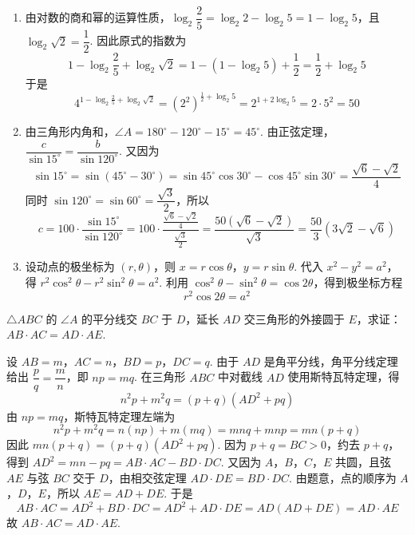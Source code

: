 \begin{solution}
\begin{enumerate}
\item 由对数的商和幂的运算性质，\(\log_2\dfrac25=\log_2 2-\log_2 5=1-\log_2 5\)，且 \(\log_2\sqrt2=\dfrac12\). 因此原式的指数为
\[
1-\log_2\dfrac25+\log_2\sqrt2
=1-\left(1-\log_2 5\right)+\dfrac12
=\dfrac12+\log_2 5
\]
于是
\[
4^{1-\log_2\frac25+\log_2\sqrt2}=\left(2^2\right)^{\frac12+\log_2 5}=2^{1+2\log_2 5}=2\cdot5^2=50
\]

\item 由三角形内角和，\(\angle A=180^\circ-120^\circ-15^\circ=45^\circ\). 由正弦定理，\(\dfrac{c}{\sin15^\circ}=\dfrac{b}{\sin120^\circ}\). 又因为
\[
\sin15^\circ=\sin\left(45^\circ-30^\circ\right)=\sin45^\circ\cos30^\circ-\cos45^\circ\sin30^\circ=\dfrac{\sqrt6-\sqrt2}{4}
\]
同时 \(\sin120^\circ=\sin60^\circ=\dfrac{\sqrt3}{2}\)，所以
\[
c=100\cdot\dfrac{\sin15^\circ}{\sin120^\circ}=100\cdot\dfrac{\frac{\sqrt6-\sqrt2}{4}}{\frac{\sqrt3}{2}}=\dfrac{50\left(\sqrt6-\sqrt2\right)}{\sqrt3}=\dfrac{50}{3}\left(3\sqrt2-\sqrt6\right)
\]

\item 设动点的极坐标为 \(\left(r,\theta\right)\)，则 \(x=r\cos\theta\)，\(y=r\sin\theta\). 代入 \(x^2-y^2=a^2\)，得 \(r^2\cos^2\theta-r^2\sin^2\theta=a^2\). 利用 \(\cos^2\theta-\sin^2\theta=\cos2\theta\)，得到极坐标方程
\[
r^2\cos2\theta=a^2
\]
\end{enumerate}
\end{solution}

\begin{problem}
\(\triangle ABC\) 的 \(\angle A\) 的平分线交 \(BC\) 于 \(D\)，延长 \(AD\) 交三角形的外接圆于 \(E\)，求证：\(AB\cdot AC=AD\cdot AE\).
\end{problem}

\begin{solution}
设 \(AB=m\)，\(AC=n\)，\(BD=p\)，\(DC=q\). 由于 \(AD\) 是角平分线，角平分线定理给出 \(\dfrac{p}{q}=\dfrac{m}{n}\)，即 \(np=mq\).
在三角形 \(ABC\) 中对截线 \(AD\) 使用斯特瓦特定理，得
\[
n^2p+m^2q=\left(p+q\right)\left(AD^2+pq\right)
\]
由 \(np=mq\)，斯特瓦特定理左端为
\[
n^2p+m^2q=n(np)+m(mq)=mnq+mnp=mn\left(p+q\right)
\]
因此 \(mn\left(p+q\right)=\left(p+q\right)\left(AD^2+pq\right)\). 因为 \(p+q=BC>0\)，约去 \(p+q\)，得到 \(AD^2=mn-pq=AB\cdot AC-BD\cdot DC\). 又因为 \(A\)，\(B\)，\(C\)，\(E\) 共圆，且弦 \(AE\) 与弦 \(BC\) 交于 \(D\)，由相交弦定理 \(AD\cdot DE=BD\cdot DC\). 由题意，点的顺序为 \(A\)，\(D\)，\(E\)，所以 \(AE=AD+DE\). 于是
\[
AB\cdot AC=AD^2+BD\cdot DC=AD^2+AD\cdot DE=AD\left(AD+DE\right)=AD\cdot AE
\]
故 \(AB\cdot AC=AD\cdot AE\).
\end{solution}

